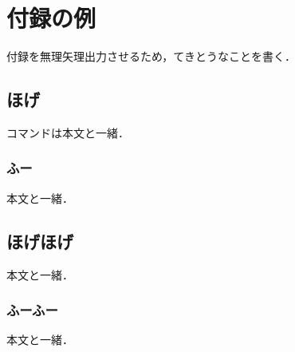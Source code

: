 \chapter{付録の例}

付録を無理矢理出力させるため，てきとうなことを書く．

\section{ほげ}

コマンドは本文と一緒．

\subsection{ふー}

本文と一緒．

\section{ほげほげ}

本文と一緒．

\subsection{ふーふー}

本文と一緒．
